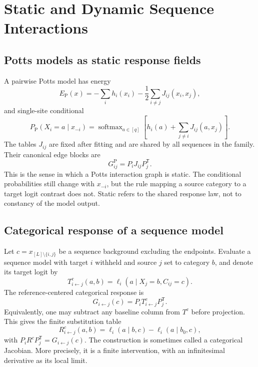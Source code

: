 \documentclass[10pt]{article}
\theoremstyle{definition}
\theoremstyle{remark}
\newcommand{\BookChapter}[1]{\section{#1}}
\newcommand{\BookInsert}[1]{}
\newcommand{\BookChapterLabel}[1]{}
\newcommand{\BookSection}[1]{\subsection{#1}}
\begin{document}
\BookInsert{chapters/03_coda}
\BookChapter{Static and Dynamic Sequence Interactions}
\BookChapterLabel{chap:book-static-dynamic}
\BookInsert{chapters/04_opening}

\BookSection{Potts models as static response fields}

A pairwise Potts model has energy
\begin{equation}
E_{\mathrm P}(x)
=-\sum_i h_i(x_i)-\frac12\sum_{i\ne j}J_{ij}(x_i,x_j),
\label{eq:potts-energy}
\end{equation}
and single-site conditional
\begin{equation}
P_{\mathrm P}(X_i=a\mid x_{-i})
=\operatorname{softmax}_{a\in[q]}
\left[h_i(a)+\sum_{j\ne i}J_{ij}(a,x_j)\right].
\label{eq:potts-conditional}
\end{equation}
The tables $J_{ij}$ are fixed after fitting and are shared by all sequences in the family.
Their canonical edge blocks are
\begin{equation}
G_{ij}^{\mathrm P}=P_iJ_{ij}P_j^{\mathsf T}.
\label{eq:potts-block}
\end{equation}
This is the sense in which a Potts interaction graph is static.  The conditional probabilities
still change with $x_{-i}$, but the rule mapping a source category to a target logit contrast does
not.  Static refers to the shared response law, not to constancy of the model output.

\BookSection{Categorical response of a sequence model}

Let $c=x_{[L]\setminus\{i,j\}}$ be a sequence background excluding the endpoints.  Evaluate a
sequence model with target $i$ withheld and source $j$ set to category $b$, and denote its target
logit by
\begin{equation}
T_{i\leftarrow j}^{c}(a,b)
=\ell_i(a\mid X_j=b,C_{ij}=c).
\label{eq:conditional-logit-table}
\end{equation}
The reference-centered categorical response is
\begin{equation}
G_{i\leftarrow j}(c)
=P_iT_{i\leftarrow j}^{c}P_j^{\mathsf T}.
\label{eq:dynamic-response}
\end{equation}
Equivalently, one may subtract any baseline column from $T^c$ before projection.  This gives the
finite substitution table
\begin{equation}
R_{i\leftarrow j}^{c}(a,b)
=\ell_i(a\mid b,c)-\ell_i(a\mid b_0,c),
\label{eq:finite-response}
\end{equation}
with $P_iR^cP_j^{\mathsf T}=G_{i\leftarrow j}(c)$.  The construction is sometimes called a
categorical Jacobian.  More precisely, it is a finite intervention, with an infinitesimal
derivative as its local limit.
\end{document}
